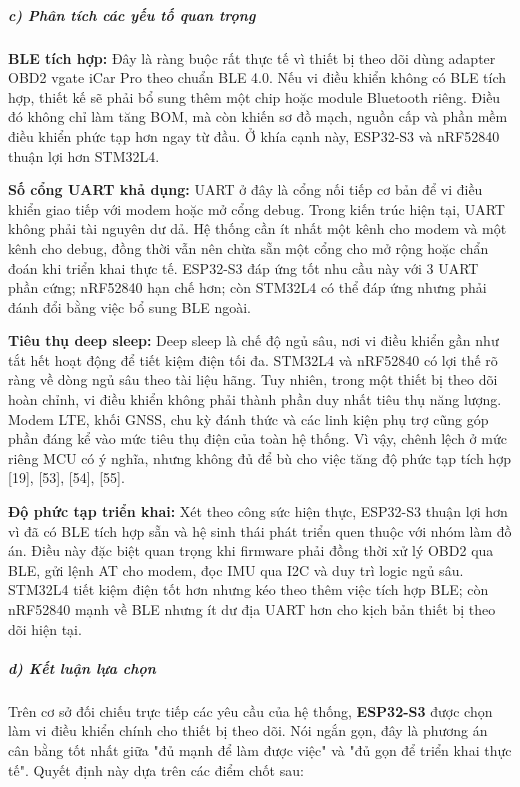 \documentclass[a4paper]{extarticle}
\begin{document}
\subparagraph{c) Phân tích các yếu tố quan
trọng}\label{c-phuxe2n-tuxedch-cuxe1c-yux1ebfu-tux1ed1-quan-trux1ecdng}

\textbf{BLE tích hợp:} Đây là ràng buộc rất thực tế vì thiết bị theo dõi dùng
adapter OBD2 vgate iCar Pro theo chuẩn BLE 4.0. Nếu vi điều khiển không
có BLE tích hợp, thiết kế sẽ phải bổ sung thêm một chip hoặc module
Bluetooth riêng. Điều đó không chỉ làm tăng BOM, mà còn khiến sơ đồ
mạch, nguồn cấp và phần mềm điều khiển phức tạp hơn ngay từ đầu. Ở khía
cạnh này, ESP32-S3 và nRF52840 thuận lợi hơn STM32L4.

\textbf{Số cổng UART khả dụng:} UART ở đây là cổng nối tiếp cơ bản để vi
điều khiển giao tiếp với modem hoặc mở cổng debug. Trong kiến trúc hiện
tại, UART không phải tài nguyên dư dả. Hệ thống cần ít nhất một kênh
cho modem và một kênh cho debug, đồng thời vẫn nên chừa sẵn một cổng cho mở
rộng hoặc chẩn đoán khi triển khai thực tế. ESP32-S3 đáp ứng tốt nhu cầu
này với 3 UART phần cứng; nRF52840 hạn chế hơn; còn STM32L4 có thể đáp
ứng nhưng phải đánh đổi bằng việc bổ sung BLE ngoài.

\textbf{Tiêu thụ deep sleep:} Deep sleep là chế độ ngủ sâu, nơi vi điều
khiển gần như tắt hết hoạt động để tiết kiệm điện tối đa. STM32L4 và
nRF52840 có lợi thế rõ ràng về dòng ngủ sâu theo tài liệu hãng. Tuy
nhiên, trong một thiết bị theo dõi hoàn chỉnh, vi điều khiển không phải thành phần
duy nhất tiêu thụ năng lượng. Modem LTE, khối GNSS, chu kỳ đánh thức và
các linh kiện phụ trợ cũng góp phần đáng kể vào mức tiêu thụ điện của toàn hệ thống. Vì
vậy, chênh lệch ở mức riêng MCU có ý nghĩa, nhưng không đủ để bù cho việc
tăng độ phức tạp tích hợp {[}19{]}, {[}53{]}, {[}54{]}, {[}55{]}.

\textbf{Độ phức tạp triển khai:} Xét theo công sức hiện thực, ESP32-S3
thuận lợi hơn vì đã có BLE tích hợp sẵn và hệ sinh thái phát triển quen
thuộc với nhóm làm đồ án. Điều này đặc biệt quan trọng khi firmware phải
đồng thời xử lý OBD2 qua BLE, gửi lệnh AT cho modem, đọc IMU qua I2C và
duy trì logic ngủ sâu. STM32L4 tiết kiệm điện tốt hơn nhưng kéo theo
thêm việc tích hợp BLE; còn nRF52840 mạnh về BLE nhưng ít dư địa UART
hơn cho kịch bản thiết bị theo dõi hiện tại.

\subparagraph{d) Kết luận lựa
chọn}\label{d-kux1ebft-luux1eadn-lux1ef1a-chux1ecdn}

Trên cơ sở đối chiếu trực tiếp các yêu cầu của hệ thống,
\textbf{ESP32-S3} được chọn làm vi điều khiển chính cho thiết bị theo dõi. Nói ngắn
gọn, đây là phương án cân bằng tốt nhất giữa "đủ mạnh để làm được việc"
và "đủ gọn để triển khai thực tế". Quyết định này dựa trên các điểm chốt
sau:
\end{document}
